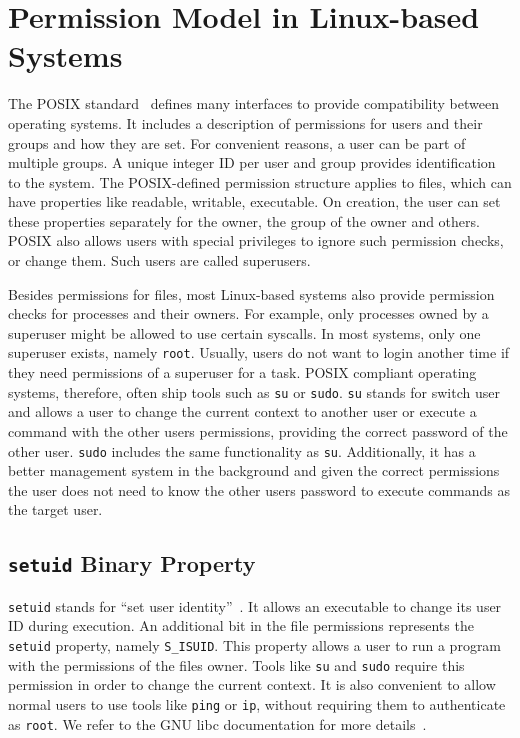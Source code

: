 \section{Permission Model in Linux-based Systems}

The POSIX standard~\cite{posix} defines many interfaces to provide
compatibility between operating systems. It includes a description of
permissions for users and their groups and how they are set. For convenient
reasons, a user can be part of multiple groups. A unique integer ID per user
and group provides identification to the system. The POSIX-defined permission
structure applies to files, which can have properties like readable, writable,
executable. On creation, the user can set these properties separately for the
owner, the group of the owner and others. POSIX also allows users with special
privileges to ignore such permission checks, or change them. Such users are
called superusers.

Besides permissions for files, most Linux-based systems also provide permission
checks for processes and their owners. For example, only processes owned by a
superuser might be allowed to use certain syscalls. In most systems, only one
superuser exists, namely \texttt{root}. Usually, users do not want to login
another time if they need permissions of a superuser for a task. POSIX compliant
operating systems, therefore, often ship tools such as \texttt{su} or
\texttt{sudo}. \texttt{su} stands for switch user and allows a user to change
the current context to another user or execute a command with the other
user\textquotesingle s permissions, providing the correct password of the other
user. \texttt{sudo} includes the same functionality as \texttt{su}.
Additionally, it has a better management system in the background and given the
correct permissions the user does not need to know the other
user\textquotesingle s password to execute commands as the target user.

\subsection{\texttt{setuid} Binary Property}

\texttt{setuid} stands for ``set user identity''~\cite{ogroupsetuid}. It allows
an executable to change its user ID during execution. An additional bit in the
file permissions represents the \texttt{setuid} property, namely
\texttt{S\_ISUID}. This property allows a user to run a program with the
permissions of the file\textquotesingle s owner. Tools like \texttt{su} and
\texttt{sudo} require this permission in order to change the current context. It
is also convenient to allow normal users to use tools like \texttt{ping} or
\texttt{ip}, without requiring them to authenticate as \texttt{root}. We refer
to the GNU libc documentation for more details~\cite{libcpermission}.

